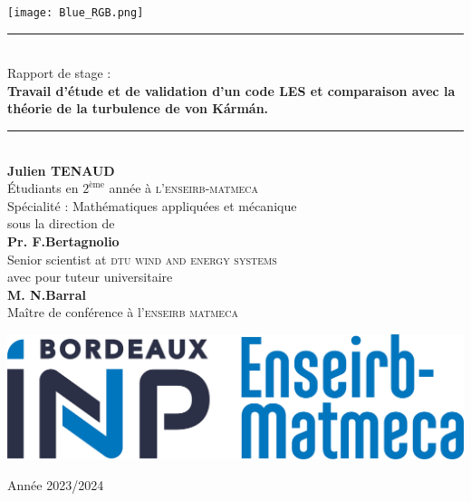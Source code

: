 \documentclass[12pt]{article}   %
\theoremstyle{plain}
\theoremstyle{remark}
\begin{document}
		
	
	\hypersetup{pdfborder=0 0 0}
	\begin{titlepage}
		
		
		\newcommand{\HRule}{\rule{\linewidth}{0.5mm}}
		\begin{center}
			
			\begin{minipage}[c]{.4\textwidth}
				\begin{center}
					\texttt{[image: Blue\_RGB.png]}
				\end{center}
			\end{minipage}
			
			\vspace{1cm}
			
			\HRule \\ [0.8cm]
			{\Large {Rapport de stage :} }\\ [0.8cm]
			{\huge \bf Travail d'étude et de validation d'un code LES et comparaison avec la théorie de la turbulence de von Kármán.} \\ [0.4cm]
			\HRule \\ [2cm]
			{\large \textbf{Julien TENAUD}} \\ [0.3cm]
			{ Étudiants en $2^{\text{ème}}$ année à \textsc{l'enseirb-matmeca}} \\ [0.2cm]
			{ Spécialité : Mathématiques appliquées et mécanique} \\ [1cm]
			{\small sous la direction de }\\ [0.6cm]
			{\large \textbf{Pr. F.Bertagnolio}} \\ [0.3cm]
			{ Senior scientist at \textsc{dtu wind and energy systems}} \\ [1cm]
			{\small avec pour tuteur universitaire }\\ [0.6cm]
			{\large \textbf{M. N.Barral}} \\ [0.3cm]
			{ Maître de conférence à l'\textsc{enseirb matmeca}}\\ [0.3cm]
			
			\vfill
			
			\begin{minipage}[c]{.4\textwidth}
				\begin{center}
					\includegraphics[width=1\textwidth]{logo_emkk.jpg}
				\end{center}
			\end{minipage}
		
			
			
			\vfill
			
			
			{Année 2023/2024}
			
			
		\end{center}
	\end{titlepage}
	
\end{document}
